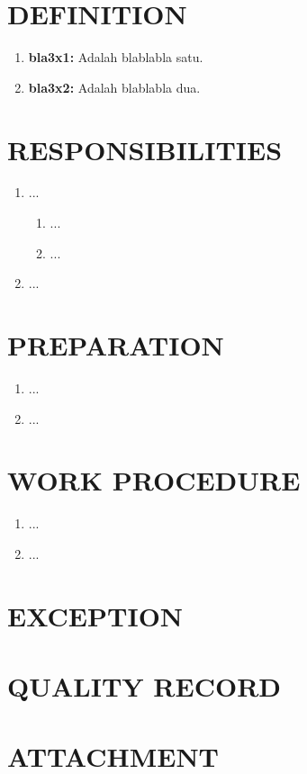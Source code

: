 \documentclass[12pt]{soi_v2}
\begin{document}
    \section{DEFINITION}
    \begin{enumerate}
        \item \textbf{bla3x1:} Adalah blablabla satu.
        \item \textbf{bla3x2:} Adalah blablabla dua.
    \end{enumerate}

    \section{RESPONSIBILITIES}
    \begin{enumerate}
        \item ...
            \begin{enumerate}
                \item ...
                \item ...
            \end{enumerate}
        \item ...
    \end{enumerate}

    \section{PREPARATION}
    \begin{enumerate}
        \item ...
        \item ...
    \end{enumerate}

    \section{WORK PROCEDURE}
    \begin{enumerate}
        \item ...
        \item ...
    \end{enumerate}

    \section{EXCEPTION}
    \section{QUALITY RECORD}
    \section{ATTACHMENT}
\end{document}
